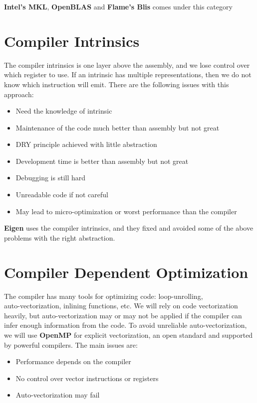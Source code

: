 \textbf{Intel's MKL}, \textbf{OpenBLAS} and \textbf{Flame's Blis} comes under this category


\section{Compiler Intrinsics}

The compiler intrinsics is one layer above the assembly, 
and we lose control over which register to use. 
If an intrinsic has multiple representations, then we 
do not know which instruction will emit. 
There are the following issues with this approach:

\begin{itemize}
    \item Need the knowledge of intrinsic
    \item Maintenance of the code much better than assembly but not great
    \item DRY principle achieved with little abstraction
    \item Development time is better than assembly but not great
    \item Debugging is still hard
    \item Unreadable code if not careful
    \item May lead to micro-optimization or worst performance than the compiler
\end{itemize}

\textbf{Eigen} uses the compiler intrinsics, and they fixed and avoided some of the above problems with the right abstraction.

\section{Compiler Dependent Optimization}

The compiler has many tools for optimizing code: loop-unrolling, \\
auto-vectorization, inlining functions, etc. We will rely on code vectorization heavily, 
but auto-vectorization may or may not be applied if the compiler can 
infer enough information from the code. To avoid unreliable auto-vectorization, 
we will use \textbf{OpenMP} for explicit vectorization, an open standard and supported by powerful compilers. 
The main issues are:

\begin{itemize}
    \item Performance depends on the compiler
    \item No control over vector instructions or registers
    \item Auto-vectorization may fail
\end{itemize}

